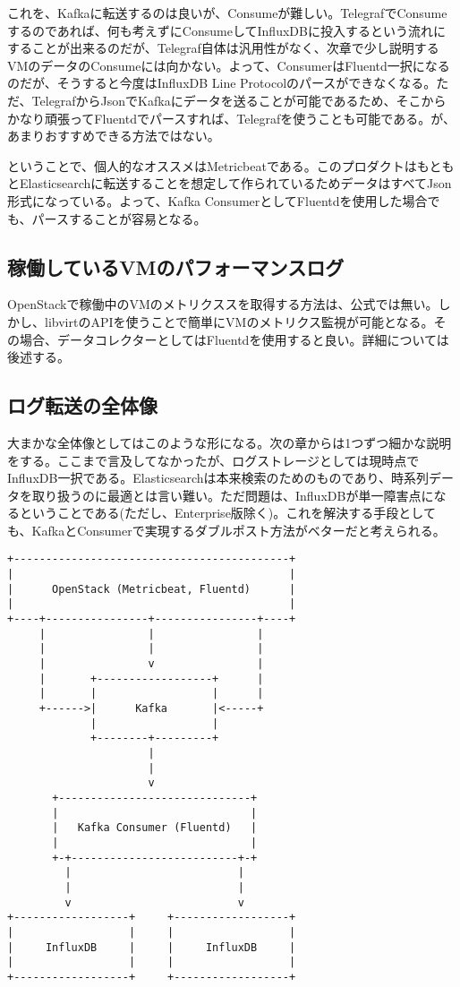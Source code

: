 これを、Kafkaに転送するのは良いが、Consumeが難しい。TelegrafでConsumeするのであれば、何も考えずにConsumeしてInfluxDBに投入するという流れにすることが出来るのだが、Telegraf自体は汎用性がなく、次章で少し説明するVMのデータのConsumeには向かない。よって、ConsumerはFluentd一択になるのだが、そうすると今度はInfluxDB Line Protocolのパースができなくなる。ただ、TelegrafからJsonでKafkaにデータを送ることが可能であるため、そこからかなり頑張ってFluentdでパースすれば、Telegrafを使うことも可能である。が、あまりおすすめできる方法ではない。

ということで、個人的なオススメはMetricbeatである。このプロダクトはもともとElasticsearchに転送することを想定して作られているためデータはすべてJson形式になっている。よって、Kafka ConsumerとしてFluentdを使用した場合でも、パースすることが容易となる。

\subsection{稼働しているVMのパフォーマンスログ}
OpenStackで稼働中のVMのメトリクススを取得する方法は、公式では無い。しかし、libvirtのAPIを使うことで簡単にVMのメトリクス監視が可能となる。その場合、データコレクターとしてはFluentdを使用すると良い。詳細については後述する。

\subsection{ログ転送の全体像}
大まかな全体像としてはこのような形になる。次の章からは1つずつ細かな説明をする。ここまで言及してなかったが、ログストレージとしては現時点でInfluxDB一択である。Elasticsearchは本来検索のためのものであり、時系列データを取り扱うのに最適とは言い難い。ただ問題は、InfluxDBが単一障害点になるということである(ただし、Enterprise版除く)。これを解決する手段としても、KafkaとConsumerで実現するダブルポスト方法がベターだと考えられる。

\begin{lstlisting}
+-------------------------------------------+
|                                           |
|      OpenStack (Metricbeat, Fluentd)      |
|                                           |
+----+----------------+----------------+----+
     |                |                |
     |                |                |
     |                v                |
     |       +------------------+      |
     |       |                  |      |
     +------>|      Kafka       |<-----+
             |                  |
             +--------+---------+
                      |
                      |
                      v
       +------------------------------+
       |                              |
       |   Kafka Consumer (Fluentd)   |
       |                              |
       +-+--------------------------+-+
         |                          |
         |                          |
         v                          v
+------------------+     +------------------+
|                  |     |                  |
|     InfluxDB     |     |     InfluxDB     |
|                  |     |                  |
+------------------+     +------------------+
\end{lstlisting}


